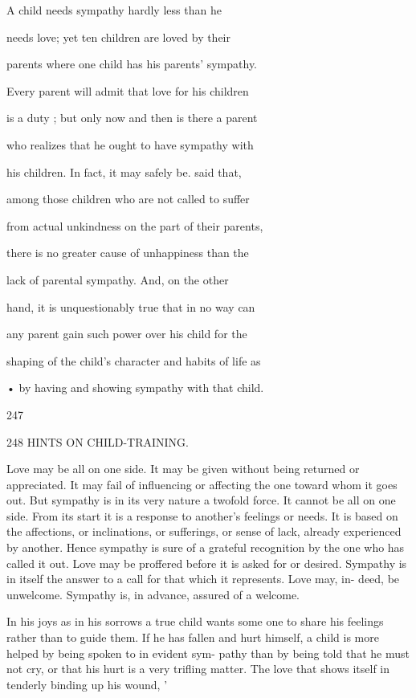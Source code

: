 \documentclass[
]{book}
\begin{document}
A child needs sympathy hardly less than he

needs love; yet ten children are loved by their

parents where one child has his parents' sympathy.

Every parent will admit that love for his children

is a duty ; but only now and then is there a parent

who realizes that he ought to have sympathy with

his children. In fact, it may safely be. said that,

among those children who are not called to suffer

from actual unkindness on the part of their parents,

there is no greater cause of unhappiness than the

lack of parental sympathy. And, on the other

hand, it is unquestionably true that in no way can

any parent gain such power over his child for the

shaping of the child's character and habits of life as

• by having and showing sympathy with that child.

247

248 HINTS ON CHILD-TRAINING.

Love may be all on one side. It may be given without being returned or appreciated. It may fail of influencing or affecting the one toward whom it goes out. But sympathy is in its very nature a twofold force. It cannot be all on one side. From its start it is a response to another's feelings or needs. It is based on the affections, or inclinations, or sufferings, or sense of lack, already experienced by another. Hence sympathy is sure of a grateful recognition by the one who has called it out. Love may be proffered before it is asked for or desired. Sympathy is in itself the answer to a call for that which it represents. Love may, in- deed, be unwelcome. Sympathy is, in advance, assured of a welcome.

In his joys as in his sorrows a true child wants some one to share his feelings rather than to guide them. If he has fallen and hurt himself, a child is more helped by being spoken to in evident sym- pathy than by being told that he must not cry, or that his hurt is a very trifling matter. The love that shows itself in tenderly binding up his wound, '
\end{document}
